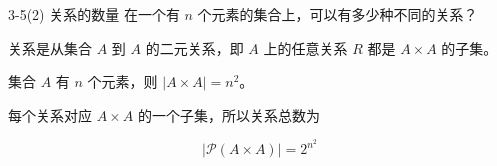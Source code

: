 \documentclass[11pt]{article}
\begin{document}
\maketitle
\thispagestyle{empty}
\newpage


\begin{question}{3-5(2) 关系的数量}
  在一个有 $n$ 个元素的集合上，可以有多少种不同的关系？

  \begin{answer}
    关系是从集合 $A$ 到 $A$ 的二元关系，即 $A$ 上的任意关系 $R$ 都是 $A \times A$ 的子集。

    集合 $A$ 有 $n$ 个元素，则 $|A \times A| = n^2$。

    每个关系对应 $A \times A$ 的一个子集，所以关系总数为

    $$|\mathcal{P}(A \times A)| = 2^{n^2}$$
  \end{answer}
\end{question}
\end{document}
